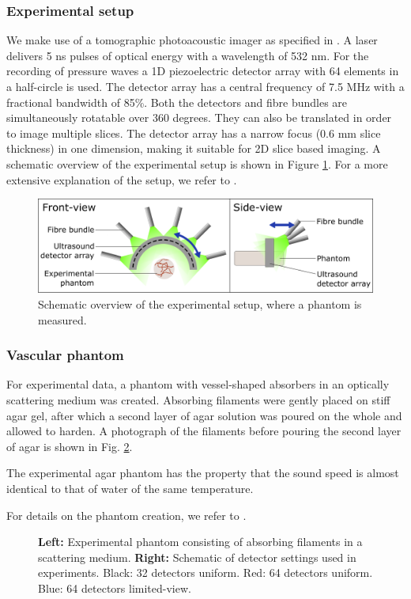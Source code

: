 \documentclass[journal]{IEEEtran}
\newcommand{\hl}[1]{\cbcolor{red}\begin{changebar}{\color{red} #1}\end{changebar}}
\begin{document}
\subsubsection{Experimental setup}
We make use of a tomographic photoacoustic imager as specified in \cite{Es2015}. A laser delivers 5 ns pulses of optical energy with a wavelength of 532 nm. For the recording of pressure waves a 1D piezoelectric detector array with 64 elements in a half-circle is used. The detector array has a central frequency of 7.5 MHz with a fractional bandwidth of 85\%. Both the detectors and fibre bundles are simultaneously rotatable over 360 degrees. They can also be translated in order to image multiple slices. The detector array has a narrow focus (0.6 mm slice thickness) in one dimension, making it suitable for 2D slice based imaging. A schematic overview of the experimental setup is shown in Figure \ref{fig:exp_setup}. For a more extensive explanation of the setup, we refer to \cite{Es2015}.

\begin{figure}[!ht]
\centering
\includegraphics[width=\linewidth]{images/Experimental_setup4.png}
\caption{Schematic overview of the experimental setup, where a phantom is measured.}
\label{fig:exp_setup}
\end{figure}

\subsubsection{Vascular phantom}
For experimental data, a phantom with vessel-shaped absorbers in an optically scattering medium was created. Absorbing filaments were gently placed on stiff agar gel, after which a second layer of agar solution was poured on the whole and allowed to harden. A photograph of the filaments before pouring the second layer of agar is shown in Fig. \ref{fig:exp_photo}. \hl{The experimental agar phantom has the property that the sound speed is almost identical to that of water of the same temperature.} For details on the phantom creation, we refer to \cite{Boink2018}. 

\begin{figure}[ht!]
\resizebox{\linewidth}{!}{%
\begin{tikzpicture}

\end{tikzpicture}}
\caption{\textbf{Left:} Experimental phantom consisting of absorbing filaments in a scattering medium. \textbf{Right:} Schematic of detector settings used in experiments. Black: 32 detectors uniform. Red: 64 detectors uniform. Blue: 64 detectors limited-view.}
\label{fig:exp_photo}
\end{figure}
\end{document}
